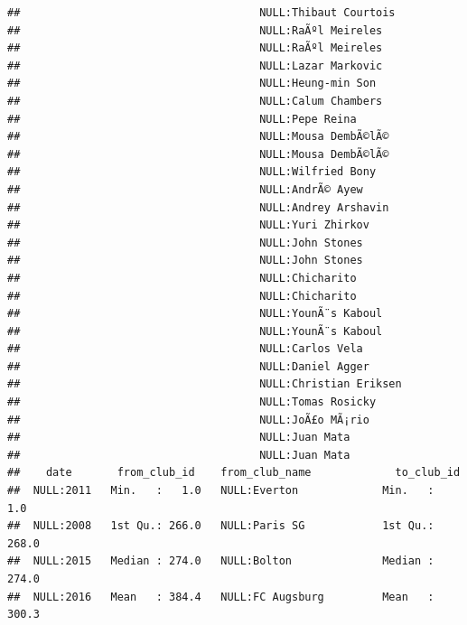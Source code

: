 \documentclass{article}\usepackage[]{graphicx}\usepackage[]{color}
\makeatletter
\newenvironment{kframe}{%
 \def\at@end@of@kframe{}%
 \ifinner\ifhmode%
  \def\at@end@of@kframe{\end{minipage}}%
  \begin{minipage}{\columnwidth}%
 \fi\fi%
 \def\FrameCommand##1{\hskip\@totalleftmargin \hskip-\fboxsep
 \colorbox{shadecolor}{##1}\hskip-\fboxsep
     \hskip-\linewidth \hskip-\@totalleftmargin \hskip\columnwidth}%
 \MakeFramed {\advance\hsize-\width
   \@totalleftmargin\z@ \linewidth\hsize
   \@setminipage}}%
 {\par\unskip\endMakeFramed%
 \at@end@of@kframe}
\newenvironment{knitrout}{}{} %
\makeatother
\begin{document}
\begin{knitrout}
\begin{kframe}
\begin{verbatim}
##                                     NULL:Thibaut Courtois                          
##                                     NULL:RaÃºl Meireles                            
##                                     NULL:RaÃºl Meireles                            
##                                     NULL:Lazar Markovic                            
##                                     NULL:Heung-min Son                             
##                                     NULL:Calum Chambers                            
##                                     NULL:Pepe Reina                                
##                                     NULL:Mousa DembÃ©lÃ©                           
##                                     NULL:Mousa DembÃ©lÃ©                           
##                                     NULL:Wilfried Bony                             
##                                     NULL:AndrÃ© Ayew                               
##                                     NULL:Andrey Arshavin                           
##                                     NULL:Yuri Zhirkov                              
##                                     NULL:John Stones                               
##                                     NULL:John Stones                               
##                                     NULL:Chicharito                                
##                                     NULL:Chicharito                                
##                                     NULL:YounÃ¨s Kaboul                            
##                                     NULL:YounÃ¨s Kaboul                            
##                                     NULL:Carlos Vela                               
##                                     NULL:Daniel Agger                              
##                                     NULL:Christian Eriksen                         
##                                     NULL:Tomas Rosicky                             
##                                     NULL:JoÃ£o MÃ¡rio                              
##                                     NULL:Juan Mata                                 
##                                     NULL:Juan Mata                                 
##    date       from_club_id    from_club_name             to_club_id    
##  NULL:2011   Min.   :   1.0   NULL:Everton             Min.   :   1.0  
##  NULL:2008   1st Qu.: 266.0   NULL:Paris SG            1st Qu.: 268.0  
##  NULL:2015   Median : 274.0   NULL:Bolton              Median : 274.0  
##  NULL:2016   Mean   : 384.4   NULL:FC Augsburg         Mean   : 300.3  

\end{verbatim}
\end{kframe}
\end{knitrout}
\end{document}
